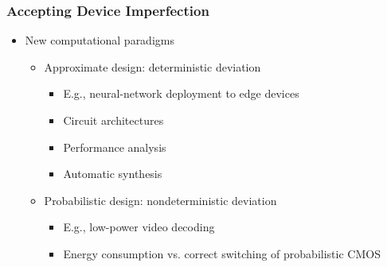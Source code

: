 \begin{frame}
      \frametitle{Accepting Device Imperfection}
      \begin{itemize}
            \item New computational paradigms
                  \begin{itemize}
                        \item Approximate design: deterministic deviation
                              \begin{itemize}
                                    \item E.g., neural-network deployment to edge devices
                                    \item Circuit architectures~\cite{Kahng2012,Ye2013,Kim2013}
                                    \item Performance analysis~\cite{Li2014,Venkatesan2011ApproxDesign}
                                    \item Automatic synthesis~\cite{Miao2013,Miao2014,Mrazek2016,Rehman2016,Venkataramani2012}
                              \end{itemize}
                        \item Probabilistic design: nondeterministic deviation
                              \begin{itemize}
                                    \item E.g., low-power video decoding
                                    \item Energy consumption vs. correct switching of probabilistic CMOS~\cite{Chakrapani2006ProbDesign}
                              \end{itemize}
                  \end{itemize}
      \end{itemize}
\end{frame}

